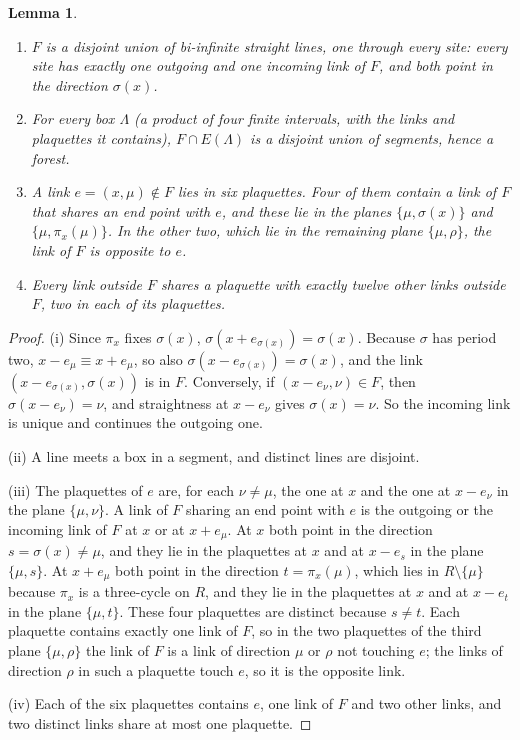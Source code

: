 \documentclass[aps,prd,twocolumn,superscriptaddress,nofootinbib,longbibliography,floatfix,amsmath,amssymb,10pt]{revtex4-2}
\newtheorem{lemma}[theorem]{Lemma}
\theoremstyle{definition}
\theoremstyle{remark}
\begin{document}
\begin{lemma}\label{lem:structure}\leavevmode
\begin{enumerate}[label=\textup{(\roman*)},leftmargin=*]
\item $F$ is a disjoint union of bi-infinite straight lines, one through
every site: every site has exactly one outgoing and one incoming link of $F$,
and both point in the direction $\sigma(x)$.
\item For every box $\Lambda$ (a product of four finite intervals, with the
links and plaquettes it contains), $F\cap E(\Lambda)$ is a disjoint union of
segments, hence a forest.
\item A link $e=(x,\mu)\notin F$ lies in six plaquettes. Four of them contain
a link of $F$ that shares an end point with $e$, and these lie in the planes
$\{\mu,\sigma(x)\}$ and $\{\mu,\pi_x(\mu)\}$. In the other two, which lie in
the remaining plane $\{\mu,\rho\}$, the link of $F$ is opposite to $e$.
\item Every link outside $F$ shares a plaquette with exactly twelve other
links outside $F$, two in each of its plaquettes.
\end{enumerate}
\end{lemma}

\begin{proof}
(i) Since $\pi_x$ fixes $\sigma(x)$, $\sigma(x+e_{\sigma(x)})=\sigma(x)$.
Because $\sigma$ has period two, $x-e_\mu\equiv x+e_\mu$, so also
$\sigma(x-e_{\sigma(x)})=\sigma(x)$, and the link $(x-e_{\sigma(x)},\sigma(x))$ is
in $F$. Conversely, if $(x-e_\nu,\nu)\in F$, then $\sigma(x-e_\nu)=\nu$, and
straightness at $x-e_\nu$ gives $\sigma(x)=\nu$. So the incoming link is unique
and continues the outgoing one.

(ii) A line meets a box in a segment, and distinct lines are disjoint.

(iii) The plaquettes of $e$ are, for each $\nu\ne\mu$, the one at $x$ and the
one at $x-e_\nu$ in the plane $\{\mu,\nu\}$. A link of $F$ sharing an end point
with $e$ is the outgoing or the incoming link of $F$ at $x$ or at $x+e_\mu$.
At $x$ both point in the direction $s=\sigma(x)\ne\mu$, and they lie in the
plaquettes at $x$ and at $x-e_s$ in the plane $\{\mu,s\}$. At $x+e_\mu$ both
point in the direction $t=\pi_x(\mu)$, which lies in $R\setminus\{\mu\}$ because
$\pi_x$ is a three-cycle on $R$, and they lie in the plaquettes at $x$ and at
$x-e_t$ in the plane $\{\mu,t\}$. These four plaquettes are distinct because
$s\ne t$. Each plaquette contains exactly one link of $F$, so in the two
plaquettes of the third plane $\{\mu,\rho\}$ the link of $F$ is a link of
direction $\mu$ or $\rho$ not touching $e$; the links of direction $\rho$ in
such a plaquette touch $e$, so it is the opposite link.

(iv) Each of the six plaquettes contains $e$, one link of $F$ and two other
links, and two distinct links share at most one plaquette.
\end{proof}
\end{document}
